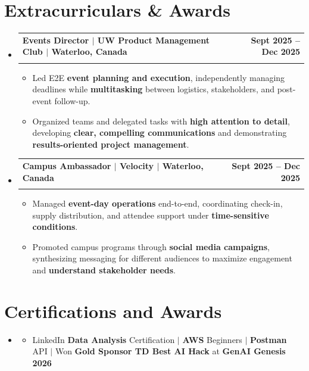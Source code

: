 \documentclass[letterpaper,10pt]{article}
\makeatletter
\newcommand{\resumeItem}[1]{
  \item\small{
    {#1 \vspace{-1pt}}
  }
}
\newcommand{\resumeSubheading}[4]{
  \vspace{-1pt}\item
    \begin{tabular*}{1.0\textwidth}[t]{l@{\extracolsep{\fill}}r}
      \textbf{#1} & \textbf{\small #2} \\
      \textit{\small#3} & \textit{\small #4} \\[-2pt]
    \end{tabular*}\vspace{-7pt}
}
\newcommand{\resumeSubHeadingListStart}{\begin{itemize}[leftmargin=0.0in, label={}]}
\newcommand{\resumeSubHeadingListEnd}{\end{itemize}}
\newcommand{\resumeItemListStart}{\begin{itemize}[leftmargin=0.15in, topsep=0pt, itemsep=0pt, parsep=0pt, partopsep=0pt]}
\newcommand{\resumeItemListEnd}{\end{itemize}\vspace{-3pt}}
\makeatother
\begin{document}
\section{Extracurriculars \& Awards}
  \resumeSubHeadingListStart
    \resumeSubheading
      {Events Director $|$ UW Product Management Club $|$ Waterloo, Canada}{Sept 2025 -- Dec 2025}
      {}{}
      \vspace{-9pt}
      \resumeItemListStart
        \resumeItem{Led E2E \textbf{event planning and execution}, independently managing deadlines while \textbf{multitasking} between logistics, stakeholders, and post-event follow-up.}
        \resumeItem{Organized teams and delegated tasks with \textbf{high attention to detail}, developing \textbf{clear, compelling communications} and demonstrating \textbf{results-oriented project management}.}
      \resumeItemListEnd
    \resumeSubheading
      {Campus Ambassador $|$ Velocity $|$ Waterloo, Canada}{Sept 2025 -- Dec 2025}
      {}{}
      \vspace{-9pt}
      \resumeItemListStart
        \resumeItem{Managed \textbf{event-day operations} end-to-end, coordinating check-in, supply distribution, and attendee support under \textbf{time-sensitive conditions}.}
        \resumeItem{Promoted campus programs through \textbf{social media campaigns}, synthesizing messaging for different audiences to maximize engagement and \textbf{understand stakeholder needs}.}
      \resumeItemListEnd
  \resumeSubHeadingListEnd
\vspace{-6pt}

\section{Certifications and Awards}
  \resumeSubHeadingListStart
    \item[]
      \resumeItemListStart
        \resumeItem{LinkedIn \textbf{Data Analysis} Certification $|$ \textbf{AWS} Beginners $|$ \textbf{Postman} API $|$ Won \textbf{Gold Sponsor TD Best AI Hack} at \textbf{GenAI Genesis 2026}}
      \resumeItemListEnd
  \resumeSubHeadingListEnd
\end{document}
